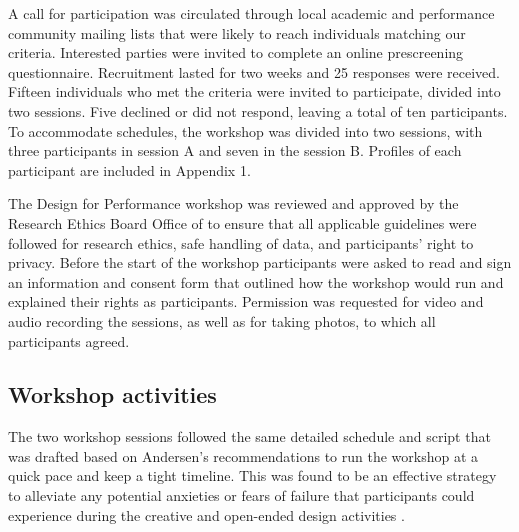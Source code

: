 \documentclass[letterpaper, 12pt]{article}
\begin{document}
A call for participation was circulated through local academic and performance community mailing lists that were likely to reach individuals matching our criteria. 
Interested parties were invited to complete an online prescreening questionnaire. Recruitment lasted for two weeks and 25 responses were received. Fifteen individuals who met the criteria were invited to participate, divided into two sessions. Five declined or did not respond, leaving a total of ten participants. To accommodate schedules, the workshop was divided into two sessions, with three participants in session A and seven in the session B. Profiles of each participant are included in Appendix 1.

The Design for Performance workshop was reviewed and approved by the Research Ethics Board Office of  to ensure that all applicable guidelines were followed for research ethics, safe handling of data, and participants' right to privacy. Before the start of the workshop participants were asked to read and sign an information and consent form that outlined how the workshop would run and explained their rights as participants. Permission was requested for video and audio recording the sessions, as well as for taking photos, to which all participants agreed.

\subsection{Workshop activities}
\label{ch3-sec:workshop-activities}

The two workshop sessions followed the same detailed schedule and script
that was drafted based on Andersen's recommendations to run the workshop at a quick pace and keep a tight timeline. This was found to be an effective strategy to alleviate any potential anxieties or fears of failure that participants could experience during the creative and open-ended design activities \citep{Andersen2017}. 
\end{document}
